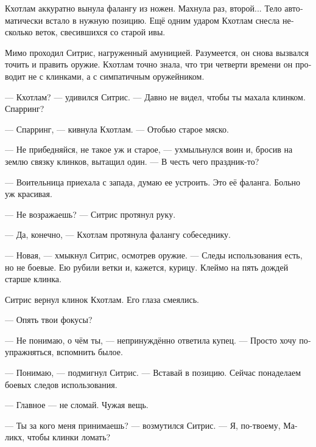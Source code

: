 \documentclass[a4paper,12pt,fleqn]{book}\usepackage{polyglossia}\setdefaultlanguage[babelshorthands=true]{russian}\setotherlanguage{english}\defaultfontfeatures{Ligatures=TeX,Mapping=tex-text}\usepackage{xcolor}\newcommand{\ml}[3]{#2}
\newcommand{\asterism}{\vspace{1em}{\centering\Large\bfseries$\ast~\ast~\ast$\par}\vspace{1em}}
\begin{document}
\asterism

Кхотлам аккуратно вынула фалангу из ножен.
Махнула раз, второй...
Тело автоматически встало в нужную позицию.
Ещё одним ударом Кхотлам снесла несколько веток, свесившихся со старой ивы.

Мимо проходил Ситрис, нагруженный амуницией.
Разумеется, он снова вызвался точить и править оружие.
Кхотлам точно знала, что три четверти времени он проводит не с клинками, а с симпатичным оружейником.

--- Кхотлам? --- удивился Ситрис.
--- Давно не видел, чтобы ты махала клинком.
Спарринг?

--- Спарринг, — кивнула Кхотлам.
--- Отобью старое мяско.

--- Не прибедняйся, не такое уж и старое, --- ухмыльнулся воин и, бросив на землю связку клинков, вытащил один.
--- В честь чего праздник-то?

--- Воительница приехала с запада, думаю ее устроить.
Это её фаланга.
Больно уж красивая.

--- Не возражаешь? --- Ситрис протянул руку.

--- Да, конечно, --- Кхотлам протянула фалангу собеседнику.

--- Новая, --- хмыкнул Ситрис, осмотрев оружие.
--- Следы использования есть, но не боевые.
Ею рубили ветки и, кажется, курицу.
Клеймо на пять дождей старше клинка.

Ситрис вернул клинок Кхотлам.
Его глаза смеялись.

--- Опять твои фокусы?

--- Не понимаю, о чём ты, --- непринуждённо ответила купец.
--- Просто хочу поупражняться, вспомнить былое.

--- Понимаю, --- подмигнул Ситрис. 
--- Вставай в позицию.
Сейчас понаделаем боевых следов использования.

--- Главное --- не сломай.
Чужая вещь.

--- Ты за кого меня принимаешь? --- возмутился Ситрис.
--- Я, по-твоему, Маликх, чтобы клинки ломать?
\end{document}
